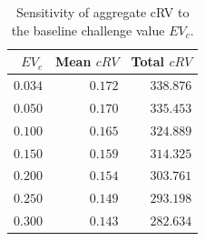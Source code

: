 \begin{table}[h]
\centering
\caption{Sensitivity of aggregate cRV to the baseline challenge value $EV_c$.}
\label{tab:evsens}
\small
\begin{tabular}{rrr}
\toprule
$EV_c$ & Mean $cRV$ & Total $cRV$ \\
\midrule
$0.034$ & $0.172$ & $338.876$ \\
$0.050$ & $0.170$ & $335.453$ \\
$0.100$ & $0.165$ & $324.889$ \\
$0.150$ & $0.159$ & $314.325$ \\
$0.200$ & $0.154$ & $303.761$ \\
$0.250$ & $0.149$ & $293.198$ \\
$0.300$ & $0.143$ & $282.634$ \\
\bottomrule
\end{tabular}
\end{table}
